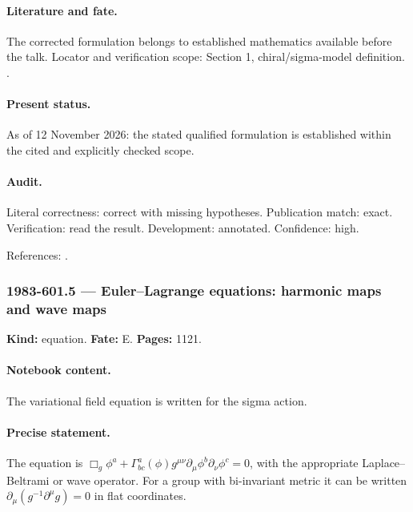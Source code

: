 \paragraph{Literature and fate.} The corrected formulation belongs to established mathematics available before the talk. Locator and verification scope: Section 1, chiral/sigma-model definition. \cite{perelomov1981instantons}.

\paragraph{Present status.} As of 12 November 2026: the stated qualified formulation is established within the cited and explicitly checked scope.

\paragraph{Audit.} Literal correctness: correct with missing hypotheses. Publication match: exact. Verification: read the result. Development: annotated. Confidence: high.

\noindent References: \citep{perelomov1981instantons}.\par

\subsubsection{1983-601.5 --- Euler--Lagrange equations: harmonic maps and wave maps}

\label{item:1983-601.5}

\noindent\textbf{Kind:} equation. \textbf{Fate:} E. \textbf{Pages:} 1121.\par

\paragraph{Notebook content.} The variational field equation is written for the sigma action.

\paragraph{Precise statement.} The equation is \(\Box_g\phi^a+\Gamma^a_{bc}(\phi)g^{\mu\nu}\partial_\mu\phi^b\partial_\nu\phi^c=0\), with the appropriate Laplace--Beltrami or wave operator. For a group with bi-invariant metric it can be written \(\partial_\mu(g^{-1}\partial^\mu g)=0\) in flat coordinates.

